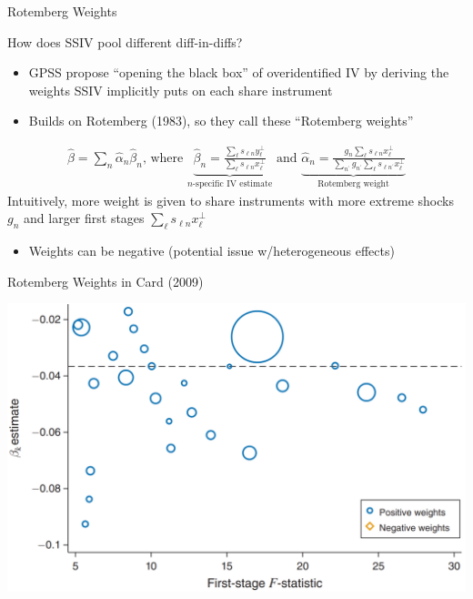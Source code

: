 \documentclass{beamer}
\begin{document}
\begin{frame}{Rotemberg Weights}

How does SSIV pool different diff-in-diffs?
\medskip
\begin{itemize}
\item GPSS propose ``opening the black box'' of overidentified IV by deriving the weights SSIV implicitly puts on each share instrument\smallskip
\item Builds on Rotemberg (1983), so they call these ``Rotemberg weights''
\end{itemize}
\begin{align*}
\hat{\beta}=\sum_n \hat{\alpha}_n\hat{\beta}_n\text{, where }\underbrace{\hat{\beta}_n=\frac{\sum_\ell s_{\ell n}y_\ell^\perp}{\sum_\ell s_{\ell n}x_\ell^\perp}}_{\text{$n$-specific IV estimate}}\text{ and }\underbrace{\hat{\alpha}_n=\frac{g_n\sum_\ell s_{\ell n}x_\ell^\perp}{\sum_{n^\prime}g_{n^\prime}\sum_\ell s_{\ell n^\prime}x_\ell^\perp}}_{\text{Rotemberg weight}}
\end{align*}\medskip\pause{}\vspace{-0.2cm}
Intuitively, more weight is given to share instruments with more extreme shocks $g_n$ and larger first stages $\sum_\ell s_{\ell n}x_\ell^\perp$\smallskip
\begin{itemize}
\item Weights can be negative (potential issue w/heterogeneous effects)
\end{itemize}
\end{frame}

\begin{frame}{Rotemberg Weights in Card (2009)}
\vspace{-0.5cm}
\begin{center}
\includegraphics[height=0.8\textheight]{lecture_includes/card_weights.png}
\end{center}
\end{frame}
\end{document}
